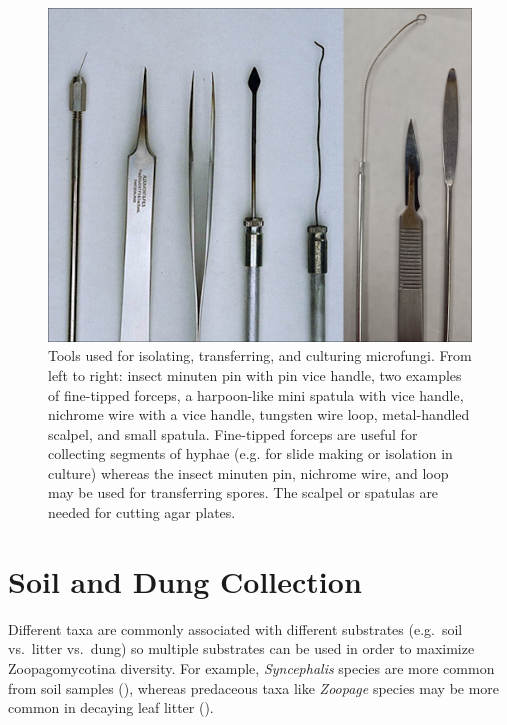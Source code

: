 \documentclass[]{book}
\begin{document}
\begin{figure}

{\centering \includegraphics[width=6.83in]{img/Ch2_Fig1} 

}

\caption{ Tools used for isolating, transferring, and culturing microfungi.  From left to right: insect minuten pin with pin vice handle, two examples of fine-tipped forceps, a harpoon-like mini spatula with vice handle, nichrome wire with a vice handle, tungsten wire loop, metal-handled scalpel, and small spatula.  Fine-tipped forceps are useful for collecting segments of hyphae (e.g. for slide making or isolation in culture) whereas the insect minuten pin, nichrome wire, and loop may be used for transferring spores.  The scalpel or spatulas are needed for cutting agar plates.}\label{fig:ch2fig1}
\end{figure}

\hypertarget{soil-and-dung-collection}{%
\section{Soil and Dung Collection}\label{soil-and-dung-collection}}

Different taxa are commonly associated with different substrates (e.g.~soil vs.~litter vs.~dung) so multiple substrates can be used in order to maximize Zoopagomycotina diversity. For example, \emph{Syncephalis} species are more common from soil samples (\citet{Benny_2016}), whereas predaceous taxa like \emph{Zoopage} species may be more common in decaying leaf litter (\citet{Duddington_1955}).
\end{document}

